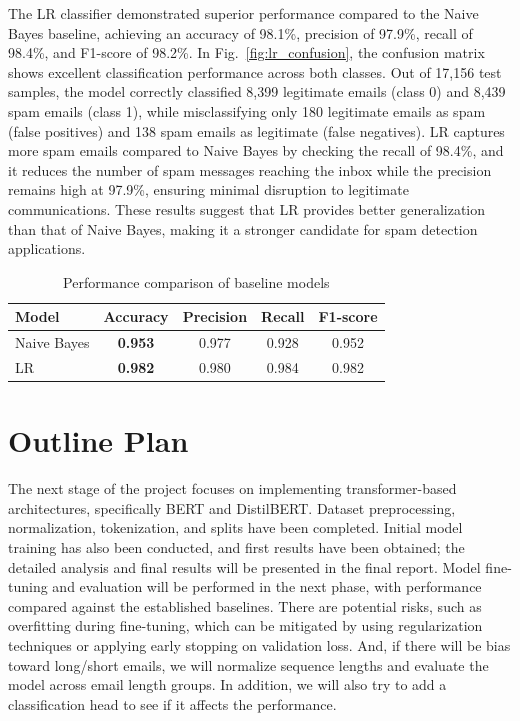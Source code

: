 \documentclass[12pt]{article}
\begin{document}
The LR classifier demonstrated superior performance compared to the Naive Bayes baseline, achieving an accuracy of 98.1\%, precision of 97.9\%, recall of 98.4\%, and F1-score of 98.2\%. In Fig.~\ref{fig:lr_confusion}, the confusion matrix shows excellent classification performance across both classes. Out of 17,156 test samples, the model correctly classified 8,399 legitimate emails (class 0) and 8,439 spam emails (class 1), while misclassifying only 180 legitimate emails as spam (false positives) and 138 spam emails as legitimate (false negatives). LR captures more spam emails compared to Naive Bayes by checking the recall of 98.4\%, and it reduces the number of spam messages reaching the inbox while the precision remains high at 97.9\%, ensuring minimal disruption to legitimate communications. These results suggest that LR provides better generalization than that of Naive Bayes, making it a stronger candidate for spam detection applications.

\begin{table}[h!]
\centering
\caption{Performance comparison of baseline models}
\begin{tabular}{lcccc}
\hline
\textbf{Model} & \textbf{Accuracy} & \textbf{Precision} & \textbf{Recall} & \textbf{F1-score} \\
\hline
Naive Bayes & \textbf{0.953} & 0.977 & 0.928 & 0.952 \\
LR & \textbf{0.982} & 0.980 & 0.984 & 0.982 \\
\hline
\end{tabular}
\label{tab:baseline_results}
\end{table}


\section{Outline Plan}
The next stage of the project focuses on implementing transformer-based architectures, specifically BERT and DistilBERT.  
Dataset preprocessing, normalization, tokenization, and splits have been completed. Initial model training has also been conducted, and first results have been obtained; the detailed analysis and final results will be presented in the final report. Model fine-tuning and evaluation will be performed in the next phase, with performance compared against the established baselines. There are potential risks, such as overfitting during fine-tuning, which can be mitigated by using regularization techniques or applying early stopping on validation loss. And, if there will be bias toward long/short emails, we will normalize sequence lengths and evaluate the model across email length groups. In addition, we will also try to add a classification head to see if it affects the performance.
\end{document}
